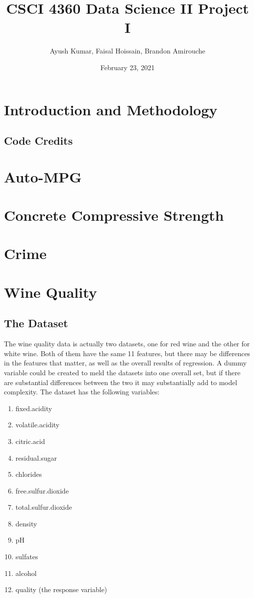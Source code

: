 \documentclass{article}
\title{CSCI 4360 Data Science II Project I}
\author{Ayush Kumar, Faisal Hoissain, Brandon Amirouche}
\date{February 23, 2021}
\begin{document}
 
	
	\maketitle
	\tableofcontents
	
	\section{Introduction and Methodology}
	\subsection{Code Credits}
	\section{Auto-MPG}
	\section{Concrete Compressive Strength} 
	\section{Crime}
	\section{Wine Quality}
	\subsection{The Dataset} 
	
	The wine quality data is actually two datasets, one for red wine and the other for white 
	wine. Both of them have the same 11 features, but there may be differences in the features 
	that matter, as well as the overall results of regression. A dummy variable could be created 
	to meld the datasets into one overall set, but if there are substantial differences between 
	the two it may substantially add to model complexity. The dataset has the following variables: 
	
	\begin{enumerate}
		\item fixed.acidity 
		\item volatile.acidity 
		\item citric.acid 
		\item residual.sugar 
		\item chlorides 
		\item free.sulfur.dioxide 
		\item total.sulfur.dioxide 
		\item density
		\item pH
		\item sulfates 
		\item alcohol 
		\item quality (the response variable)
	\end{enumerate}
\end{document}
